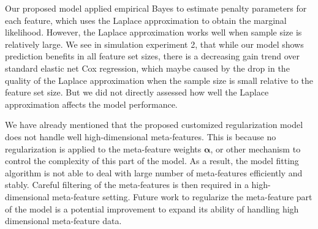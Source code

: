 Our proposed model applied empirical Bayes to estimate penalty parameters for each feature, which uses the Laplace approximation to obtain the marginal likelihood. However, the Laplace approximation works well when sample size is relatively large. We see in simulation experiment 2, that while our model shows prediction benefits in all feature set sizes, there is a decreasing gain trend over standard elastic net Cox regression, which maybe caused by the drop in the quality of the Laplace approximation when the sample size is  small relative to the feature set size.  But we did not directly assessed how well the Laplace approximation affects the model performance. 

We have already mentioned that the proposed customized regularization model does not handle well high-dimensional  meta-features. This is because no regularization is applied to the meta-feature weights $\bm{\alpha}$, or other mechanism to control the complexity of this part of the model. As a result, the model fitting algorithm is not able to deal with large number of meta-features efficiently and stably. Careful filtering of the meta-features is then required in a high-dimensional meta-feature setting. Future work to regularize the meta-feature part of the model is a potential improvement to expand its ability of handling high dimensional meta-feature data.
